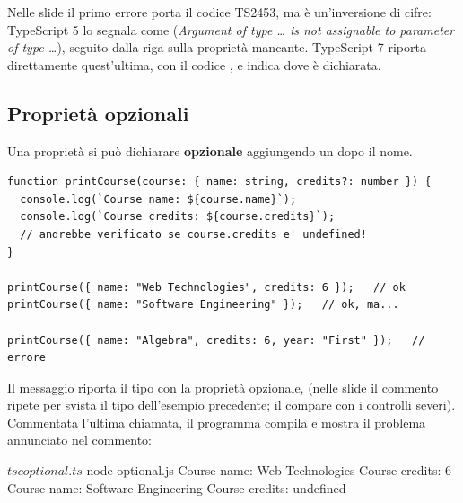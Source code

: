 Nelle slide il primo errore porta il codice TS2453, ma è un'inversione di
cifre: TypeScript 5 lo segnala come  (\textit{Argument of type
\ldots{} is not assignable to parameter of type \ldots}), seguito dalla riga
sulla proprietà mancante. TypeScript 7 riporta direttamente quest'ultima, con il
codice , e indica dove  è dichiarata.

\subsection{Proprietà opzionali}

Una proprietà si può dichiarare \textbf{opzionale} aggiungendo un  dopo
il nome.

\begin{lstlisting}[style=ts, name=optional.ts]
function printCourse(course: { name: string, credits?: number }) {
  console.log(`Course name: ${course.name}`);
  console.log(`Course credits: ${course.credits}`);
  // andrebbe verificato se course.credits e' undefined!
}

printCourse({ name: "Web Technologies", credits: 6 });   // ok
printCourse({ name: "Software Engineering" });   // ok, ma...

printCourse({ name: "Algebra", credits: 6, year: "First" });   // errore
\end{lstlisting}


Il messaggio riporta il tipo con la proprietà opzionale,  (nelle slide il commento ripete per svista il tipo dell'esempio
precedente; il  compare con i controlli severi). Commentata
l'ultima chiamata, il programma compila e mostra il problema annunciato nel
commento:

\begin{console}[Terminale]
$ tsc optional.ts
$ node optional.js
Course name: Web Technologies
Course credits: 6
Course name: Software Engineering
Course credits: undefined
\end{console}

